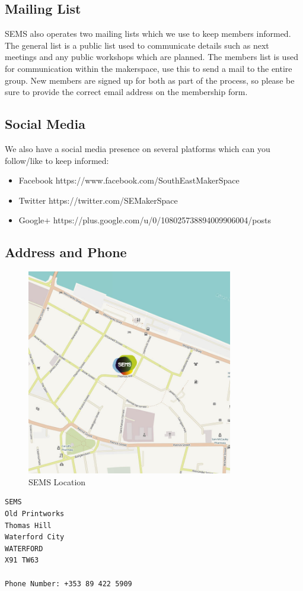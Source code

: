 \documentclass{article}
\begin{document}
\subsection*{Mailing List}
SEMS also operates two mailing lists which we use to keep members informed. The general list is a public list used to communicate details such as next meetings and any public workshops which are planned. The members list is used for communication within the makerspace, use this to send a mail to the entire group. New members are signed up for both as part of the process, so please be sure to provide the correct email address on the membership form.


\subsection*{Social Media}
We also have a social media presence on several platforms which can you
follow/like to keep informed:

\begin{itemize}
\item Facebook https://www.facebook.com/SouthEastMakerSpace
\item Twitter https://twitter.com/SEMakerSpace
\item Google+ https://plus.google.com/u/0/108025738894009906004/posts
\end{itemize}


\subsection*{Address and Phone}

%
\begin{figure}[ht]
	\centering
	\includegraphics[width=9cm]{sems_local_map_750_750}
	\caption{SEMS Location}
	\label{fig:sems_location}
\end{figure}
%


\begin{verbatim}
SEMS
Old Printworks
Thomas Hill
Waterford City
WATERFORD
X91 TW63

Phone Number: +353 89 422 5909
\end{verbatim} \par
\end{document}
